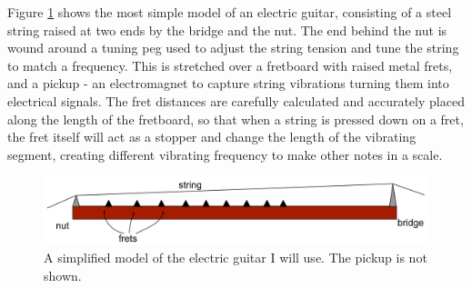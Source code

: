 Figure \ref{fig1} shows the most simple model of an electric guitar, consisting of a steel string raised at two ends by the bridge and the nut. The end behind the nut is wound around a tuning peg used to adjust the string tension and tune the string to match a frequency. This is stretched over a fretboard with raised metal frets, and a pickup - an electromagnet to capture string vibrations turning them into electrical signals. The fret distances are carefully calculated and accurately placed along the length of the fretboard, so that when a string is pressed down on a fret, the fret itself will act as a stopper and change the length of the vibrating segment, creating different vibrating frequency to make other notes in a scale. 
\begin{figure}[!htbp]
    \includegraphics[width=\textwidth]{./ee/fig1.png}
    \caption{A simplified model of the electric guitar I will use. The pickup is not shown.}\label{fig1}
\end{figure} 